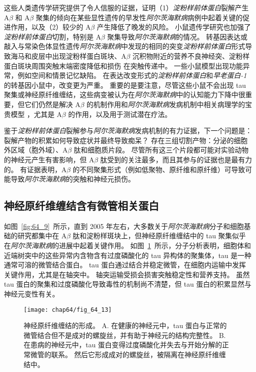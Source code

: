 这些人类遗传学研究提供了令人信服的证据，证明（1）\textit{淀粉样前体蛋白}裂解产生 A$\beta$ 和 A$\beta$ 聚集的倾向在某些显性遗传的早发性\textit{阿尔茨海默病}病例中起着关键的促进作用，以及（2）较少的 A$\beta$ 产生降低了晚发的风险。
小鼠遗传学研究也加强了\textit{淀粉样前体蛋白}切割，特别是 A$\beta$ 聚集导致\textit{阿尔茨海默病}的情况。
转基因表达或敲入与常染色体显性遗传\textit{阿尔茨海默病}中发现的相同的突变\textit{淀粉样前体蛋白}形式导致海马和皮层中出现淀粉样蛋白斑块、A$\beta$ 沉积物附近的营养不良神经突、淀粉样蛋白斑块周围突触末端密度降低和损伤 在突触传递中。
一些小鼠模型出现功能异常，例如空间和情景记忆缺陷。
在表达改变形式的\textit{淀粉样前体蛋白}和\textit{早老蛋白-1}的转基因小鼠中，改变更为严重。
重要的是要注意，尽管这些小鼠不会出现 tau 聚集或神经原纤维缠结，这些病变被认为在\textit{阿尔茨海默病}中的认知能力下降中很重要，但它们仍然是解决 A$\beta$ 的机制作用和\textit{阿尔茨海默病}发病机制中相关病理学的宝贵模型 ，尤其是 A$\beta$ 的作用，以及用于测试潜在疗法。


鉴于\textit{淀粉样前体蛋白}裂解参与\textit{阿尔茨海默病}发病机制的有力证据，下一个问题是：
裂解产物的积累如何导致症状并最终导致痴呆？
存在三组切割产物：分泌的细胞外区域（胞外域）、A$\beta$ 肽和细胞质片段。
尽管所有这三个片段都可能对实验动物的神经元产生有害影响，但 A$\beta$ 肽受到的关注最多，而且其参与的证据也是最有力的。
有证据表明，A$\beta$ 的不同聚集形式（例如低聚物、原纤维和原纤维）可导致可能导致\textit{阿尔茨海默病}的突触和神经元损伤。



\subsection{神经原纤维缠结含有微管相关蛋白}

如图~\ref{fig:64_9}~所示，直到 2005 年左右，大多数关于\textit{阿尔茨海默病}分子和细胞基础的研究都集中在 A$\beta$ 肽和淀粉样斑块上，但神经原纤维缠结中的 tau 聚集似乎在\textit{阿尔茨海默病}的进展中起着关键作用。
如图~\ref{fig:64_13}~所示，分子分析表明，细胞体和近端树突中的这些异常内含物含有过度磷酸化的 tau 异构体的聚集体，tau 是一种通常可溶的微管结合蛋白。
tau 蛋白通过结合并稳定微管，在细胞内运输中发挥关键作用，尤其是在轴突中。
轴突运输受损会损害突触稳定性和营养支持。
虽然 tau 蛋白的聚集和过度磷酸化导致毒性的机制尚不清楚，但 tau 蛋白的积累显然与神经元变性有关。


\begin{figure}[htbp]
	\centering
	\texttt{[image: chap64/fig\_64\_13]}
	\caption{神经原纤维缠结的形成。
		A. 在健康的神经元中，tau 蛋白与正常的微管结合但不是成对的螺旋丝，并有助于神经元的结构完整性。
		B. 在患病的神经元中，tau 蛋白变得过度磷酸化并失去与开始分解的正常微管的联系。
		然后它形成成对的螺旋丝，被隔离在神经原纤维缠结中。}
	\label{fig:64_13}
\end{figure}


